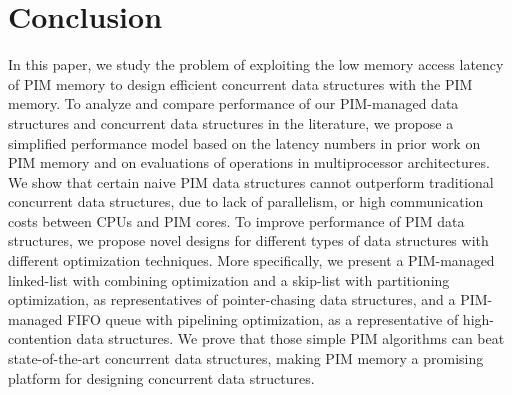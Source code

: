 \section{Conclusion}
\label{section:conclusion}
In this paper, we study the problem of exploiting the low memory access latency of PIM memory to design efficient concurrent data structures with the PIM memory. 
To analyze and compare performance of our PIM-managed data structures and concurrent data structures in the literature, we propose a simplified performance model based on the latency numbers in prior work on PIM
memory and on evaluations of operations in multiprocessor architectures. 
We show that certain naive PIM data structures cannot outperform traditional concurrent data structures, 
due to lack of parallelism, or high communication costs between CPUs and PIM cores.  
To improve performance of PIM data structures, we propose novel designs for different types of data structures with different optimization techniques.   
More specifically, we present a PIM-managed linked-list with combining optimization and a skip-list with partitioning optimization, as representatives of pointer-chasing data structures, 
and a PIM-managed FIFO queue with pipelining optimization, as a representative of high-contention data structures. 
We prove that those simple PIM algorithms can beat state-of-the-art concurrent data structures, making PIM memory a promising platform for designing concurrent data structures.
 